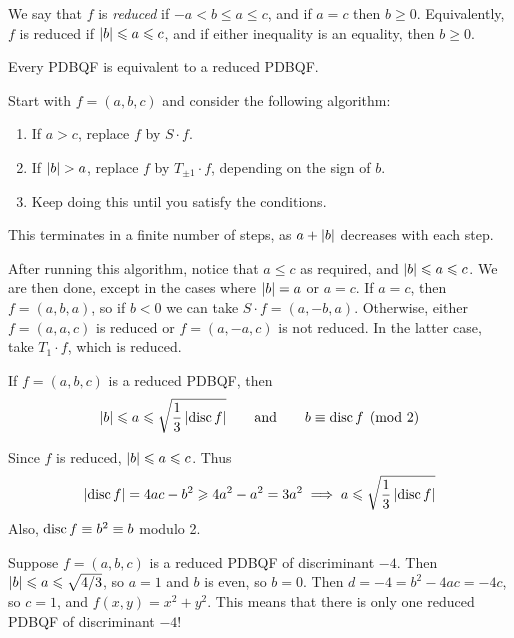\documentclass{article}
\begin{document}
\begin{note}
	We say that $f$ is \textit{reduced} if $-a < b \leq a \leq c$, and if $a = c$ then $b \geq 0$. Equivalently, $f$ is reduced if $\left\lvert b \right\rvert \leqslant a \leqslant c$, and if either inequality is an equality, then $b \geq 0$.
\end{note}

\begin{proposition}
	\label{reduction-possible}
    Every PDBQF is equivalent to a reduced PDBQF.
\end{proposition}

\begin{prf}
    Start with $f = (a, b, c)$ and consider the following algorithm:
    \begin{enumerate}
    	\item If $a > c$, replace $f$ by $S \cdot f$.
    	\item If $\left\lvert b \right\rvert > a$, replace $f$ by $T_{\pm 1} \cdot f$, depending on the sign of $b$.
    	\item Keep doing this until you satisfy the conditions.
	\end{enumerate}
	This terminates in a finite number of steps, as $a + \left\lvert b \right\rvert$ decreases with each step.
	
	After running this algorithm, notice that $a \leq c$ as required, and $\left\lvert b \right\rvert \leqslant a \leqslant c$. We are then done, except in the cases where $\left\lvert b \right\rvert = a$ or $a = c$. If $a = c$, then $f = (a, b, a)$, so if $b < 0$ we can take $S \cdot f = (a, -b, a)$. Otherwise, either $f = (a, a, c)$ is reduced or $f = (a, -a, c)$ is not reduced. In the latter case, take $T_1 \cdot f$, which is reduced.
\end{prf}

\begin{proposition}
    If $f = (a, b, c)$ is a reduced PDBQF, then
    \[
	\left\lvert b \right\rvert \leqslant a \leqslant \sqrt{\frac{1}{3} \left\lvert \operatorname{disc} f \right\rvert} \qquad \text{and} \qquad b \equiv \operatorname{disc} f \pmod{2}
	\]
\end{proposition}

\begin{prf}
    Since $f$ is reduced, $\left\lvert b \right\rvert \leqslant a \leqslant c$. Thus
    \[
	\left\lvert \operatorname{disc} f \right\rvert = 4ac - b^2 \geqslant 4a^2 - a^2 = 3a^2 \implies a \leqslant \sqrt{\frac{1}{3} \left\lvert \operatorname{disc} f \right\rvert}
	\]
	Also, $\operatorname{disc} f \equiv b^2 \equiv b$ modulo 2.
\end{prf}

Suppose $f = (a, b, c)$ is a reduced PDBQF of discriminant $-4$. Then $\left\lvert b \right\rvert \leqslant a \leqslant \sqrt{4/3}$, so $a = 1$ and $b$ is even, so $b = 0$. Then $d = -4 = b^2 - 4ac = -4c$, so $c = 1$, and $f(x, y) = x^2 + y^2$. This means that there is only one reduced PDBQF of discriminant $-4$!
\end{document}
